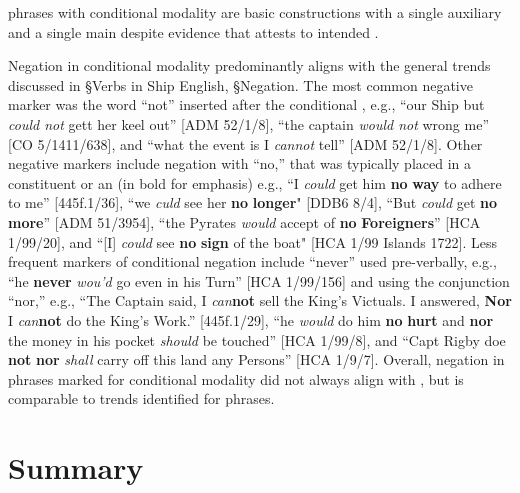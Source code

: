  phrases with conditional modality are basic constructions with a single auxiliary and a single main  despite evidence that attests to intended . 

Negation in conditional modality predominantly aligns with the general trends discussed in §Verbs in Ship English, §Negation. The most common negative marker was the word “not” inserted after the conditional , e.g., “our Ship but \textit{could not} gett her keel out” [ADM 52/1/8], “the captain \textit{would not} wrong me” [CO 5/1411/638], and “what the event is I \textit{cannot} tell” [ADM 52/1/8]. Other negative markers include negation with “no,” that was typically placed in a  constituent or an  (in bold for emphasis) e.g., “I \textit{could} get him \textbf{no} \textbf{way} to adhere to me” [445f.1/36], “we \textit{culd} see her \textbf{no} \textbf{longer}" [DDB6 8/4], “But \textit{could} get \textbf{no} \textbf{more}” [ADM 51/3954], “the Pyrates \textit{would} accept of \textbf{no} \textbf{Foreigners}” [HCA 1/99/20], and “[I] \textit{could} see \textbf{no} \textbf{sign} of the boat" [HCA 1/99  Islands 1722]. Less frequent markers of conditional negation include “never” used pre-verbally, e.g., “he \textbf{never} \textit{wou’d} go even in his Turn” [HCA 1/99/156] and  using the conjunction “nor,” e.g., “The Captain said, I \textit{can}\textbf{not} sell the King’s Victuals. I answered, \textbf{Nor} I \textit{can}\textbf{not} do the King’s Work.” [445f.1/29], “he \textit{would} do him \textbf{no} \textbf{hurt} and \textbf{nor} the money in his pocket \textit{should} be touched” [HCA 1/99/8], and “Capt Rigby doe \textbf{not} \textbf{nor} \textit{shall} carry off this land any Persons” [HCA 1/9/7]. Overall, negation in  phrases marked for conditional modality did not always align with , but is comparable to trends identified for  phrases. 

\section{{Summary}}\label{sec:6.5}

